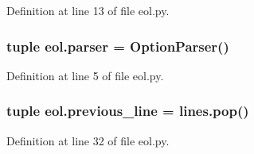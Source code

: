 Definition at line 13 of file eol.\+py.

\hypertarget{namespaceeol_a8a05add7959e24b3aeae7e605d8a1828}{
\subsubsection[{parser}]{\setlength{\rightskip}{0pt plus 5cm}tuple eol.\+parser = Option\+Parser()}}\label{namespaceeol_a8a05add7959e24b3aeae7e605d8a1828}


Definition at line 5 of file eol.\+py.

\hypertarget{namespaceeol_a76b2223d0522fbcbbe9d3ed8c8af2375}{
\subsubsection[{previous\+\_\+line}]{\setlength{\rightskip}{0pt plus 5cm}tuple eol.\+previous\+\_\+line = lines.\+pop()}}\label{namespaceeol_a76b2223d0522fbcbbe9d3ed8c8af2375}


Definition at line 32 of file eol.\+py.

